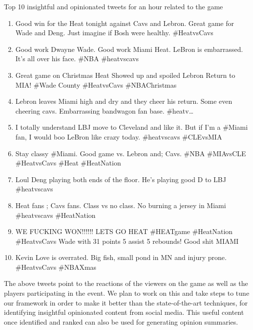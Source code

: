 Top 10 insightful and opinionated tweets for an hour related to the game
\begin{enumerate}

\item	Good win for the Heat tonight against Cavs and Lebron. Great game for Wade and Deng. Just imagine if Bosh were healthy. \#HeatvsCavs

\item	Good work Dwayne Wade. Good work Miami Heat. LeBron is embarrassed. It's all over his face. \#NBA \#heatvscavs

\item	Great game on Christmas Heat Showed up and spoiled Lebron Return to MIA! \#Wade County \#HeatvsCavs \#NBAChristmas

\item	Lebron leaves Miami high and dry and they cheer his return. Some even cheering cavs. Embarrassing bandwagon fan base. \#heatv…

\item	I totally understand LBJ move to Cleveland and like it. But if I'm a \#Miami fan, I would boo LeBron like crazy today. \#heatvscavs \#CLEvsMIA

\item	Stay classy \#Miami. Good game vs. Lebron and; Cavs. \#NBA \#MIAvsCLE \#HeatvsCavs \#Heat \#HeatNation

\item Loul Deng playing both ends of the floor. He's playing good D to LBJ \#heatvscavs

\item	Heat fans ; Cavs fans. Class vs no class. No burning a jersey in Miami \#heatvscavs \#HeatNation

\item	WE FUCKING WON!!!!!! LETS GO HEAT \#HEATgame \#HeatNation \#HeatvsCavs Wade with 31 points 5 assist 5 rebounds! Good shit MIAMI

\item	Kevin Love is overrated. Big fish, small pond in MN and injury prone. \#HeatvsCavs \#NBAXmas

\end{enumerate}

The above tweets point to the reactions of the viewers on the game as well as the players participating in the event. We plan to work on this and take steps to tune our framework in order to make it better than the state-of-the-art techniques, for identifying insightful opinionated content from social media. This useful content once identified and ranked can also be used for generating opinion summaries. 







